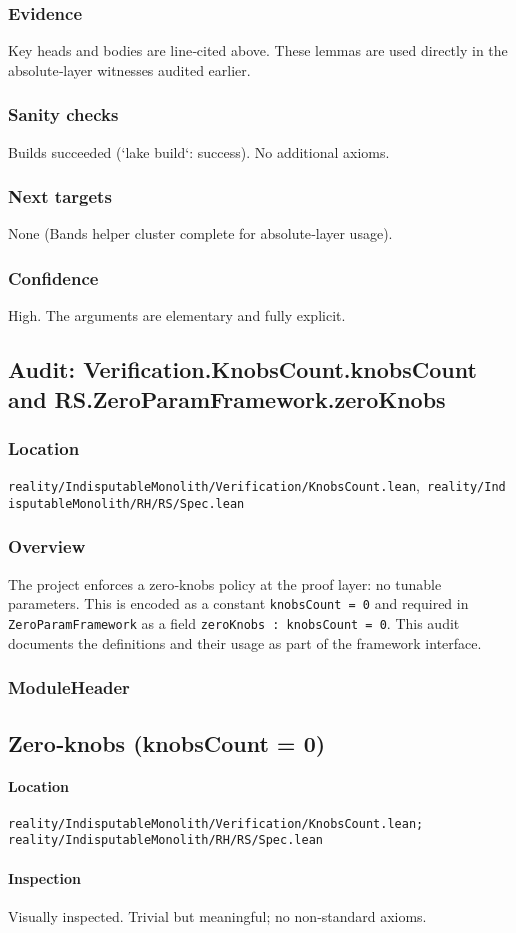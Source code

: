 \documentclass{article}
\newcommand{\FileRef}[1]{\texttt{#1}}
\newcommand{\ModuleHeader}[3]{%
  \subsection{#1}
  \paragraph{Location} \FileRef{#2}\\
  \paragraph{Inspection} #3
}
\begin{document}
\subsubsection{Evidence}
Key heads and bodies are line‑cited above. These lemmas are used directly in the absolute‑layer witnesses audited earlier.

\subsubsection{Sanity checks}
Builds succeeded (`lake build`: success). No additional axioms.

\subsubsection{Next targets}
None (Bands helper cluster complete for absolute‑layer usage).

\subsubsection{Confidence}
High. The arguments are elementary and fully explicit.

\subsection{Audit: Verification.KnobsCount.knobsCount and RS.ZeroParamFramework.zeroKnobs}
\subsubsection{Location}
\FileRef{reality/IndisputableMonolith/Verification/KnobsCount.lean},\ \FileRef{reality/IndisputableMonolith/RH/RS/Spec.lean}

\subsubsection{Overview}
The project enforces a zero‑knobs policy at the proof layer: no tunable parameters. This is encoded as a constant \texttt{knobsCount = 0} and required in \texttt{ZeroParamFramework} as a field \texttt{zeroKnobs : knobsCount = 0}. This audit documents the definitions and their usage as part of the framework interface.

\subsubsection{ModuleHeader}
\ModuleHeader{Zero‑knobs (knobsCount = 0)}{reality/IndisputableMonolith/Verification/KnobsCount.lean; reality/IndisputableMonolith/RH/RS/Spec.lean}{Visually inspected. Trivial but meaningful; no non‑standard axioms.}
\end{document}
